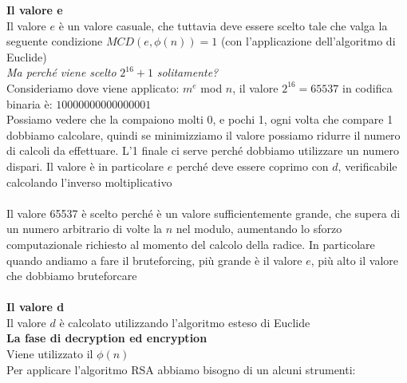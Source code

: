 \documentclass[11pt, oneside]{article}   	%
\begin{document}
\textbf{Il valore e}\\
Il valore $e$ è un valore casuale, che tuttavia deve essere scelto tale che valga la seguente condizione $MCD(e, \phi(n))=1$ (con l'applicazione dell'algoritmo di Euclide)\\ \emph{Ma perché viene scelto} $2^{16}+1$ \emph{solitamente?}\\
Consideriamo dove viene applicato: $m^e$ mod $n$, il valore $2^{16} = 65537$ in codifica binaria è: $10000000000000001$\\
Possiamo vedere che la compaiono molti 0, e pochi 1, ogni volta che compare 1 dobbiamo calcolare, quindi se minimizziamo il valore possiamo ridurre il numero di calcoli da effettuare. L'1 finale ci serve perché dobbiamo utilizzare un numero dispari. Il valore è in particolare $e$ perché deve essere coprimo con $d$, verificabile calcolando l'inverso moltiplicativo \\\\Il valore 65537 è scelto perché è un valore sufficientemente grande, che supera di un numero arbitrario di volte la $n$ nel modulo, aumentando lo sforzo computazionale richiesto al momento del calcolo della radice. In particolare quando andiamo a fare il bruteforcing, più grande è il valore $e$, più alto il valore che dobbiamo bruteforcare\\\\
\textbf{Il valore d}\\
Il valore $d$ è calcolato utilizzando l'algoritmo esteso di Euclide\\
\textbf{La fase di decryption ed encryption}\\
Viene utilizzato il $\phi(n)$\\

Per applicare l'algoritmo RSA abbiamo bisogno di un alcuni strumenti:
\end{document}
